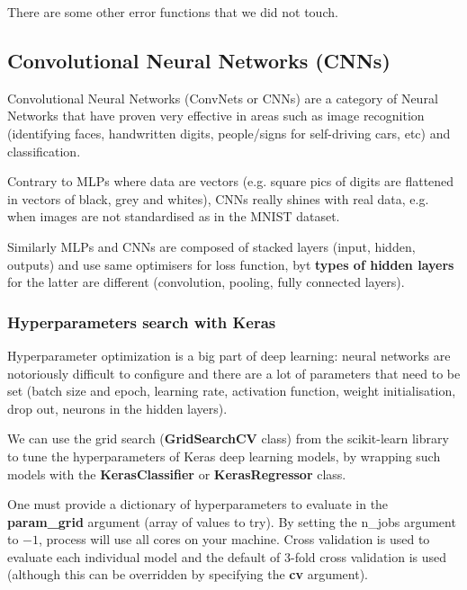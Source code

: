 \documentclass[11pt]{article}
\begin{document}
There are some other error functions that we did not touch.

\subsection{Convolutional Neural Networks (CNNs)}
Convolutional Neural Networks (ConvNets or CNNs) are a category of Neural Networks that have proven very effective in areas such as image recognition (identifying faces, handwritten digits, people/signs for self-driving cars, etc) and classification. 

Contrary to MLPs where data are vectors (e.g. square pics of digits are flattened in vectors of black, grey and whites), CNNs really shines with real data, e.g. when images are not standardised as in the MNIST dataset.

Similarly MLPs and CNNs are composed of stacked layers (input, hidden, outputs) and use same optimisers for loss function, byt \textbf{types of hidden layers} for the latter are different (convolution, pooling, fully connected layers).

\subsubsection{Hyperparameters search with Keras}
Hyperparameter optimization is a big part of deep learning: neural networks are notoriously difficult to configure and there are a lot of parameters that need to be set (batch size and epoch, learning rate, activation function, weight initialisation, drop out, neurons in the hidden layers).

We can use the grid search (\textbf{GridSearchCV} class) from the scikit-learn library to tune the hyperparameters of Keras deep learning models, by wrapping such models with the \textbf{KerasClassifier} or \textbf{KerasRegressor} class.

One must provide a dictionary of hyperparameters to evaluate in the \textbf{param\_grid} argument (array of values to try). By setting the n\_jobs argument to $-1$, process will use all cores on your machine. Cross validation is used to evaluate each individual model and the default of 3-fold cross validation is used (although this can be overridden by specifying the \textbf{cv} argument).
\end{document}
